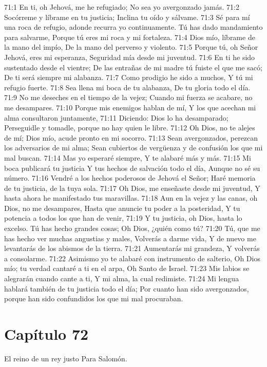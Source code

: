 71:1 En ti, oh Jehová, me he refugiado; 
No sea yo avergonzado jamás. 
71:2 Socórreme y líbrame en tu justicia; 
Inclina tu oído y sálvame. 
71:3 Sé para mí una roca de refugio, adonde recurra yo continuamente. 
Tú has dado mandamiento para salvarme, 
Porque tú eres mi roca y mi fortaleza. 
71:4 Dios mío, líbrame de la mano del impío, 
De la mano del perverso y violento. 
71:5 Porque tú, oh Señor Jehová, eres mi esperanza, 
Seguridad mía desde mi juventud. 
71:6 En ti he sido sustentado desde el vientre; 
De las entrañas de mi madre tú fuiste el que me sacó; 
De ti será siempre mi alabanza. 
71:7 Como prodigio he sido a muchos, 
Y tú mi refugio fuerte. 
71:8 Sea llena mi boca de tu alabanza, 
De tu gloria todo el día. 
71:9 No me deseches en el tiempo de la vejez; 
Cuando mi fuerza se acabare, no me desampares. 
71:10 Porque mis enemigos hablan de mí, 
Y los que acechan mi alma consultaron juntamente, 
71:11 Diciendo: Dios lo ha desamparado; 
Perseguidle y tomadle, porque no hay quien le libre. 
71:12 Oh Dios, no te alejes de mí; 
Dios mío, acude pronto en mi socorro. 
71:13 Sean avergonzados, perezcan los adversarios de mi alma; 
Sean cubiertos de vergüenza y de confusión los que mi mal buscan. 
71:14 Mas yo esperaré siempre, 
Y te alabaré más y más. 
71:15 Mi boca publicará tu justicia 
Y tus hechos de salvación todo el día, 
Aunque no sé su número. 
71:16 Vendré a los hechos poderosos de Jehová el Señor; 
Haré memoria de tu justicia, de la tuya sola. 
71:17 Oh Dios, me enseñaste desde mi juventud, 
Y hasta ahora he manifestado tus maravillas. 
71:18 Aun en la vejez y las canas, oh Dios, no me desampares, 
Hasta que anuncie tu poder a la posteridad, 
Y tu potencia a todos los que han de venir, 
71:19 Y tu justicia, oh Dios, hasta lo excelso. 
Tú has hecho grandes cosas; 
Oh Dios, ¿quién como tú? 
71:20 Tú, que me has hecho ver muchas angustias y males, 
Volverás a darme vida, 
Y de nuevo me levantarás de los abismos de la tierra. 
71:21 Aumentarás mi grandeza, 
Y volverás a consolarme. 
71:22 Asimismo yo te alabaré con instrumento de salterio, 
Oh Dios mío; tu verdad cantaré a ti en el arpa, 
Oh Santo de Israel. 
71:23 Mis labios se alegrarán cuando cante a ti, 
Y mi alma, la cual redimiste. 
71:24 Mi lengua hablará también de tu justicia todo el día; 
Por cuanto han sido avergonzados, porque han sido confundidos los que mi mal procuraban. 
\section*{Capítulo 72}
El reino de un rey justo 
Para Salomón. 
 
